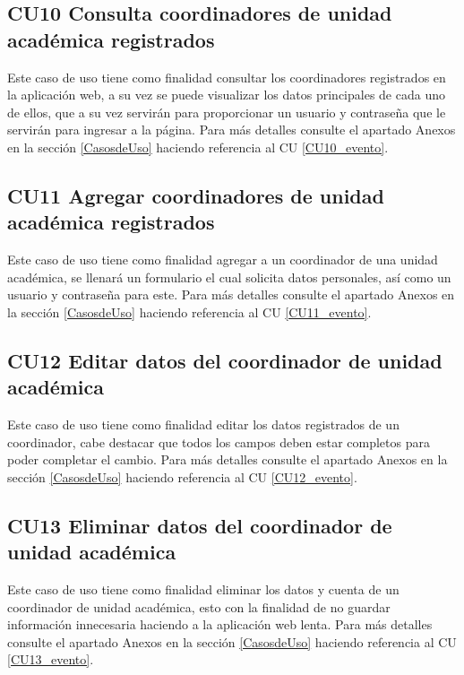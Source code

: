 		\subsection{CU10 Consulta coordinadores de unidad académica registrados}
		\noindent Este caso de uso tiene como finalidad consultar los coordinadores registrados en la aplicación web, a su vez se puede visualizar los datos principales de cada uno de ellos, que a su vez servirán para proporcionar un usuario y contraseña que le servirán para ingresar a la página. Para más detalles consulte el apartado Anexos en la sección \ref{CasosdeUso} haciendo referencia al CU \ref{CU10_evento}.
		\\
		
		\subsection{CU11 Agregar coordinadores de unidad académica registrados}
		\noindent Este caso de uso tiene como finalidad agregar a un coordinador de una unidad académica, se llenará un formulario el cual solicita datos personales, así como un usuario y contraseña para este. Para más detalles consulte el apartado Anexos en la sección \ref{CasosdeUso} haciendo referencia al CU \ref{CU11_evento}.\\
		
		\subsection{CU12 Editar datos del coordinador de unidad académica}
		\noindent Este caso de uso tiene como finalidad editar los datos registrados de un coordinador, cabe destacar que todos los campos deben estar completos para poder completar el cambio. Para más detalles consulte el apartado Anexos en la sección \ref{CasosdeUso} haciendo referencia al CU \ref{CU12_evento}.\\
		
		\subsection{CU13 Eliminar datos del coordinador de unidad académica}
		\noindent Este caso de uso tiene como finalidad eliminar los datos y cuenta de un coordinador de unidad académica, esto con la finalidad de no guardar información innecesaria haciendo a la aplicación web lenta. Para más detalles consulte el apartado Anexos en la sección \ref{CasosdeUso} haciendo referencia al CU \ref{CU13_evento}.\\
		
